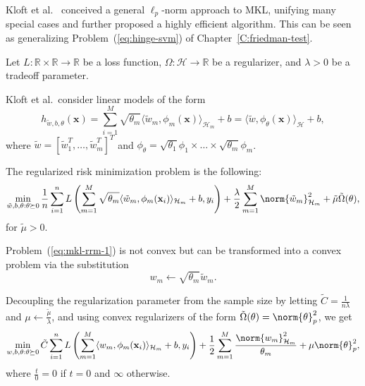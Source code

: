 Kloft et al.\ \cite{kloft2011lp} conceived a general $\ell_p$-norm approach
to MKL, unifying many special cases and further proposed a highly efficient
algorithm.  This can be seen as generalizing Problem~(\ref{eq:hinge-svm})
of Chapter~\ref{C:friedman-test}.

Let $L: \mathbb{R} \times \mathbb{R} \to \mathbb{R}$ be a loss function,
$\Omega : \mathcal{H} \to \mathbb{R}$ be a regularizer, and $\lambda > 0$
be a tradeoff parameter.

Kloft et al.\ consider linear models of the form
\begin{equation*}
  h_{\tilde{w},b,\theta}({\mathbf x}) = \sum_{i=1}^M \sqrt{\theta_m} \langle \tilde{w}_m, \phi_m ({\mathbf x}) \rangle_{\mathcal{H}_m} + b
  = \langle \tilde{w}, \phi_{\theta}({\mathbf x}) \rangle_{\mathcal{H}} + b,
\end{equation*}
where $\tilde{w} = [\tilde{w}_1^T,\ldots,\tilde{w}_m^T]^T$ and
$\phi_{\theta} = \sqrt{\theta_1} \phi_1 \times \ldots \times \sqrt{\theta_m} \phi_m$.

The regularized risk minimization problem is the following:
\begin{equation}
  \label{eq:mkl-rrm-1}
  \min_{\tilde{w}, b, \theta : \theta \succeq 0} \frac{1}{n} \sum_{i=1}^n L \left (
  \sum_{m=1}^M \sqrt{\theta_m} \langle \tilde{w}_m, \phi_m({\mathbf x}_i) \rangle_{\mathcal{H}_m} + b, y_i
  \right) + \frac{\lambda}{2}\sum_{m=1}^M \norm{\tilde{w}_m}_{\mathcal{H}_m}^2 +
  \tilde{\mu} \tilde{\Omega}(\theta),
\end{equation}
for $\tilde{\mu} > 0$.

Problem~(\ref{eq:mkl-rrm-1}) is not convex but can be transformed into a convex
problem via the substitution
\begin{equation*}
  w_m \leftarrow \sqrt{\theta_m} \tilde{w}_m.
\end{equation*}

Decoupling the regularization parameter from the sample size by letting
$\tilde{C} = \frac{1}{n \lambda}$ and $\mu \leftarrow \frac{\tilde{\mu}}{\lambda}$,
and using convex regularizers of the form $\tilde{\Omega}(\theta) = \norm{\theta}_p^2$,
we get
\begin{equation}
  \label{eq:mkl-rrm-2}
  \min_{w, b, \theta : \theta \succeq 0} \tilde{C} \sum_{i=1}^n L \left (
  \sum_{m=1}^M \langle w_m, \phi_m({\mathbf x}_i) \rangle_{\mathcal{H}_m} + b, y_i
  \right) + \frac{1}{2} \sum_{m=1}^M \frac{\norm{w_m}_{\mathcal{H}_m}^2}{\theta_m} +
  \mu\norm{\theta}_p^2,
\end{equation}
where $\frac{t}{0} = 0$ if $t=0$ and $\infty$ otherwise.

